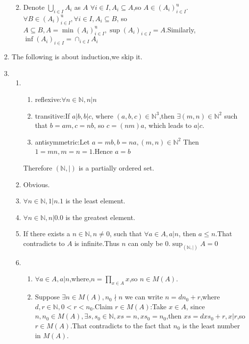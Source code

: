 \documentclass[12pt]{article}
\newcommand{\NN}{\mathbb{N}}
\begin{document}
\begin{enumerate}
\begin{enumerate}
\begin{enumerate}
                \end{enumerate}
            \item Denote $\bigcup_{i\in I}A_i$ as $A$
            \newline$\forall i\in I,A_i\subseteq A$,so $A\in (A_i)_{i\in I}^\mathrm{u}$.$\forall B\in  (A_i)_{i\in I}^\mathrm{u},\forall i \in I,A_i\subseteq B$, so $A\subseteq B,A=\min  (A_i)_{i\in I}^\mathrm{u},\sup  (A_i)_{i\in I}=A$.Similarly,$\inf  (A_i)_{i\in I}=\cap_{i\in I}A_i$
        \end{enumerate}
    \item The following is about induction,we skip it.
    \setcounter{enumi}{21}
    \item 
        \begin{enumerate}
            \item 
                \begin{enumerate}
                    \item reflexive:$\forall n\in \mathbb{N},n|n$
                    \item transitive:If $a|b,b|c$, where $(a,b,c)\in \mathbb{N}^3$,then $\exists (m,n)\in \mathbb{N}^2$ such that $b=am,c=nb$, so $c=(nm)a$, which leads to $a|c$.
                    \item antisymmetric:Let $a=mb,b=na,(m,n)\in \mathbb{N}^2$
                    \newline
                    Then $1=mn,m=n=1$.Hence $a=b$
                \end{enumerate}
                Therefore $(\mathbb{N},|)$ is a partially ordered set.
            \item Obvious.
            \item $\forall n\in \mathbb{N},1|n$.$1$ is the least element.
            \item $\forall n \in \mathbb{N},n|0$.$0$ is the greatest element.
            \item If there exists a $n\in \mathbb{N},n\not=0$, such that $\forall a\in A,a|n$, then $a\le n $.That contradicts to $A$ is infinite.Thus $n$ can only be $0$.$\sup _{(\mathbb{N},|)}A=0$
            \item 
                \begin{enumerate}
                    \item $\forall a\in A, a|n$,where,$\displaystyle n=\prod_{x\in A}x$,so $n\in M(A)$.
                    \item Suppose $\exists n\in M(A),n_0\nmid n$ we can write $n=dn_0+r$,where $d,r\in \NN,0<r<n_0$.Claim $r\in M(A)$:Take $x\in A$, since $n,n_0\in M(A),\exists s,s_0\in \NN,xs=n,xs_0=n_0$,then $xs=dxs_0+r,x|r$,so$r\in M(A)$.That contradicts to the fact that $n_0$ is the least number in $M(A)$.

\end{enumerate}
\end{enumerate}
\end{enumerate}
\end{document}
